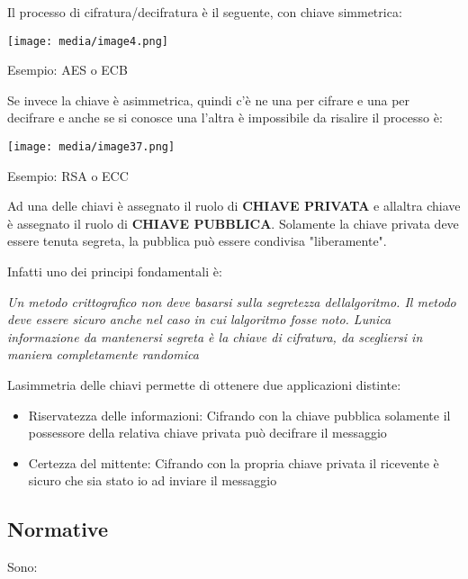 Il processo di cifratura/decifratura è il seguente, con chiave
simmetrica:

\texttt{[image: media/image4.png]}

Esempio: AES o ECB

Se invece la chiave è asimmetrica, quindi c'è ne una per cifrare e una
per decifrare e anche se si conosce una l'altra è impossibile da
risalire il processo è:

\texttt{[image: media/image37.png]}

Esempio: RSA o ECC

Ad una delle chiavi è assegnato il ruolo di \textbf{CHIAVE PRIVATA} e
all\textquotesingle altra chiave è assegnato il ruolo di \textbf{CHIAVE
PUBBLICA}. Solamente la chiave privata deve essere tenuta segreta, la
pubblica può essere condivisa "liberamente".

Infatti uno dei principi fondamentali è:

\emph{Un metodo crittografico non deve basarsi sulla segretezza
dell\textquotesingle algoritmo. Il metodo deve essere sicuro anche nel
caso in cui l\textquotesingle algoritmo fosse noto.
L\textquotesingle unica informazione da mantenersi segreta è la chiave
di cifratura, da scegliersi in maniera completamente randomica}

L\textquotesingle asimmetria delle chiavi permette di ottenere due
applicazioni distinte:

\begin{itemize}
\item
  Riservatezza delle informazioni: Cifrando con la chiave pubblica
  solamente il possessore della relativa chiave privata può decifrare il
  messaggio
\item
  Certezza del mittente: Cifrando con la propria chiave privata il
  ricevente è sicuro che sia stato io ad inviare il messaggio
\end{itemize}

\subsection{Normative}\label{normative}

Sono:

